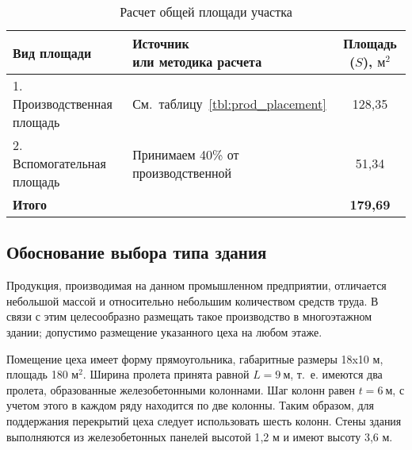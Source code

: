 \begin{table} [h!]
  \caption{
    Расчет общей площади участка
  }\label{tbl:common_placement}
    \begin{tabular}{| m{5.8cm} | m{5.75cm} | c |}
      \hline
      \parbox{5.8cm}{
        \smallskip
        \centering Вид  площади
        \smallskip
      }
      & \parbox{5.75cm}{
          \smallskip
          \centering Источник \\ или методика расчета
          \smallskip
      }
      & Площадь (\( S \)), \( \text{м}^2 \) \\
      \hline

      1. Производственная \newline площадь 
      & \centering См.~таблицу~\ref{tbl:prod_placement}
      & 128{,}35 \\
      \hline

      2. Вспомогательная \newline площадь 
      & \centering Принимаем 40\% \newline от производственной
      & 51{,}34 \\
      \hline
      
      \raggedleft \textbf{Итого} & & \textbf{179{,}69} \\
      \hline
    \end{tabular}
\end{table}

\subsection{Обоснование выбора типа здания}

Продукция, производимая на данном промышленном предприятии,
отличается небольшой массой и относительно небольшим количеством средств труда.
В связи с этим целесообразно размещать такое производство в многоэтажном здании;
допустимо размещение указанного цеха на любом этаже.

Помещение цеха имеет форму прямоугольника, габаритные размеры 18x10 м, 
площадь 180 \( \text{м}^2 \).
Ширина пролета принята равной \( L = 9 \: \text{м} \),
т.~е. имеются два пролета, образованные железобетонными колоннами. 
Шаг колонн равен \( t = 6 \: \text{м} \), с учетом этого в каждом ряду находится
по две колонны.
Таким образом, для поддержания перекрытий цеха следует использовать шесть колонн.
Стены здания выполняются из железобетонных панелей высотой 1{,}2 м и
имеют высоту 3{,}6 м.
